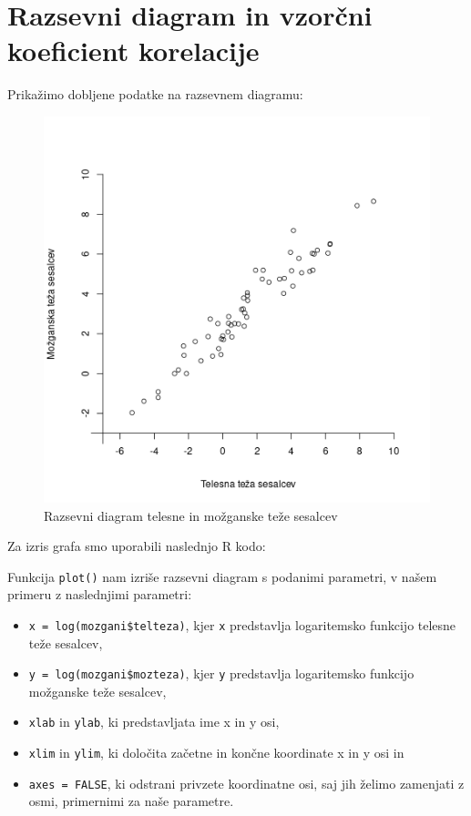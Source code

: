 \section{Razsevni diagram in vzorčni koeficient korelacije}

Prikažimo dobljene podatke na razsevnem diagramu:

\begin{figure}[h]
    \centering
    \includegraphics[scale=0.7]{res/razsevni-diagram.png}
    \caption{Razsevni diagram telesne in možganske teže sesalcev}
    \label{img:razs-diag}
\end{figure}

\noindent
Za izris grafa smo uporabili naslednjo R kodo:



\newpage
Funkcija \verb|plot()| nam izriše razsevni diagram s podanimi parametri, v našem primeru z naslednjimi parametri:

\begin{itemize}
    \item \verb|x = log(mozgani$telteza)|, kjer \verb|x| predstavlja logaritemsko funkcijo telesne teže sesalcev,
    \item \verb|y = log(mozgani$mozteza)|, kjer \verb|y| predstavlja logaritemsko funkcijo možganske teže sesalcev,
    \item \verb|xlab| in \verb|ylab|, ki predstavljata ime x in y osi,
    \item \verb|xlim| in \verb|ylim|, ki določita začetne in končne koordinate x in y osi in
    \item \verb|axes = FALSE|, ki odstrani privzete koordinatne osi, saj jih želimo zamenjati z osmi, primernimi za
    naše parametre.
\end{itemize}

